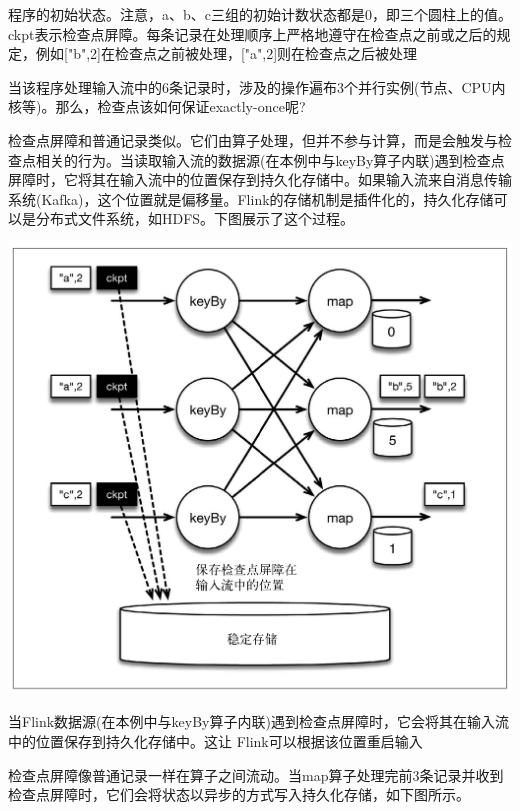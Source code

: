 \documentclass[oneside]{ctexbook}
\begin{document}
程序的初始状态。注意，a、b、c三组的初始计数状态都是0，即三个圆柱上的值。ckpt表示检查点屏障。每条记录在处理顺序上严格地遵守在检查点之前或之后的规定，例如["b",2]在检查点之前被处理，["a",2]则在检查点之后被处理

当该程序处理输入流中的6条记录时，涉及的操作遍布3个并行实例(节点、CPU内核等)。那么，检查点该如何保证exactly-once呢?

检查点屏障和普通记录类似。它们由算子处理，但并不参与计算，而是会触发与检查点相关的行为。当读取输入流的数据源(在本例中与keyBy算子内联)遇到检查点屏障时，它将其在输入流中的位置保存到持久化存储中。如果输入流来自消息传输系统(Kafka)，这个位置就是偏移量。Flink的存储机制是插件化的，持久化存储可以是分布式文件系统，如HDFS。下图展示了这个过程。

\noindent \includegraphics[width=\textwidth]{ckpt2.png}

当Flink数据源(在本例中与keyBy算子内联)遇到检查点屏障时，它会将其在输入流中的位置保存到持久化存储中。这让 Flink可以根据该位置重启输入

检查点屏障像普通记录一样在算子之间流动。当map算子处理完前3条记录并收到检查点屏障时，它们会将状态以异步的方式写入持久化存储，如下图所示。
\end{document}
